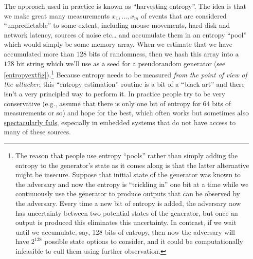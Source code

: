 The approach used in practice is known as ``harvesting entropy''. The
idea is that we make great many measurements \(x_1,\ldots,x_m\) of
events that are considered ``unpredictable'' to some extent, including
mouse movements, hard-disk and network latency, sources of noise
etc\ldots{} and accumulate them in an entropy ``pool'' which would
simply be some memory array. When we estimate that we have accumulated
more than \(128\) bits of randomness, then we hash this array into a
\(128\) bit string which we'll use as a seed for a pseudorandom
generator (see \cref{entropyextfig}).\footnote{The reason that people
  use entropy ``pools'' rather than simply adding the entropy to the
  generator's state as it comes along is that the latter alternative
  might be insecure. Suppose that initial state of the generator was
  known to the adversary and now the entropy is ``trickling in'' one bit
  at a time while we continuously use the generator to produce outputs
  that can be observed by the adversary. Every time a new bit of entropy
  is added, the adversary now has uncertainty between two potential
  states of the generator, but once an output is produced this
  eliminates this uncertainty. In contrast, if we wait until we
  accumulate, say, 128 bits of entropy, then now the adversary will have
  \(2^{128}\) possible state options to consider, and it could be
  computationally infeasible to cull them using further observation.}
Because entropy needs to be measured \emph{from the point of view of the
attacker}, this ``entropy estimation'' routine is a bit of a ``black
art'' and there isn't a very principled way to perform it. In practice
people try to be very conservative (e.g., assume that there is only one
bit of entropy for 64 bits of measurements or so) and hope for the best,
which often works but sometimes also
\href{https://factorable.net/paper.html}{spectacularly fails},
especially in embedded systems that do not have access to many of these
sources.


